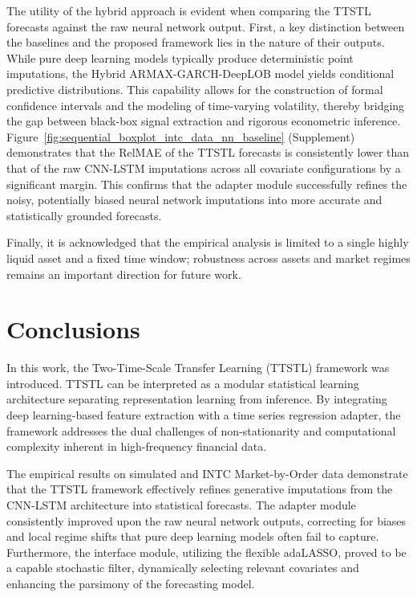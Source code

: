 \documentclass[10pt,a4paper,oneside]{article}
\begin{document}
The utility of the hybrid approach is evident when comparing the TTSTL forecasts against the raw neural network output. First, a key distinction between the baselines and the proposed framework lies in the nature of their outputs. While pure deep learning models typically produce deterministic point imputations, the Hybrid ARMAX-GARCH-DeepLOB model yields conditional predictive distributions. This capability allows for the construction of formal confidence intervals and the modeling of time-varying volatility, thereby bridging the gap between black-box signal extraction and rigorous econometric inference. Figure~\ref{fig:sequential_boxplot_intc_data_nn_baseline} (Supplement) demonstrates that the RelMAE of the TTSTL forecasts is consistently lower than that of the raw CNN-LSTM imputations across all covariate configurations by a significant margin. This confirms that the adapter module successfully refines the noisy, potentially biased neural network imputations into more accurate and statistically grounded forecasts.

Finally, it is acknowledged that the empirical analysis is limited to a single highly liquid asset and a fixed time window; robustness across assets and market regimes remains an important direction for future work.

\section{Conclusions}
\label{Sect:Conclusions}

In this work, the Two-Time-Scale Transfer Learning (TTSTL) framework was introduced. TTSTL can be interpreted as a modular statistical learning architecture separating representation learning from inference. By integrating deep learning-based feature extraction with a time series regression adapter, the framework addresses the dual challenges of non-stationarity and computational complexity inherent in high-frequency financial data.

The empirical results on simulated and INTC Market-by-Order data demonstrate that the TTSTL framework effectively refines generative imputations from the CNN-LSTM architecture into statistical forecasts. The adapter module consistently improved upon the raw neural network outputs, correcting for biases and local regime shifts that pure deep learning models often fail to capture. Furthermore, the interface module, utilizing the flexible adaLASSO, proved to be a capable stochastic filter, dynamically selecting relevant covariates and enhancing the parsimony of the forecasting model.
\end{document}
